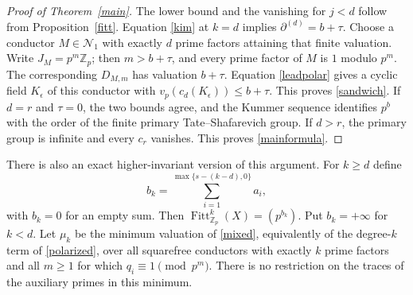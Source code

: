 \documentclass[11pt]{article}
\theoremstyle{remark}\newtheorem{remark}[theorem]{Remark}
\newcommand{\Z}{\mathbb Z}\newcommand{\Q}{\mathbb Q}\newcommand{\F}{\mathbb F}
\newcommand{\Fitt}{\operatorname{Fitt}}
\begin{document}
\begin{proof}[Proof of Theorem~\ref{main}]
The lower bound and the vanishing for $j<d$ follow from Proposition~\ref{fitt}. Equation \eqref{kim} at $k=d$ implies $\partial^{(d)}=b+\tau$. Choose a conductor $M\in\mathcal N_1$ with exactly $d$ prime factors attaining that finite valuation. Write $J_M=p^m\Z_p$; then $m>b+\tau$, and every prime factor of $M$ is $1$ modulo $p^m$. The corresponding $D_{M,m}$ has valuation $b+\tau$. Equation \eqref{leadpolar} gives a cyclic field $K_\epsilon$ of this conductor with $v_p(c_d(K_\epsilon))\leq b+\tau$. This proves \eqref{sandwich}. If $d=r$ and $\tau=0$, the two bounds agree, and the Kummer sequence identifies $p^b$ with the order of the finite primary Tate--Shafarevich group. If $d>r$, the primary group is infinite and every $c_r$ vanishes. This proves \eqref{mainformula}.
\end{proof}

There is also an exact higher-invariant version of this argument. For $k\geq d$ define
\[
 b_k=\sum_{i=1}^{\max\{s-(k-d),0\}}a_i,
\]
with $b_k=0$ for an empty sum. Then $\Fitt^k_{\Z_p}(X)=(p^{b_k})$. Put $b_k=+\infty$ for $k<d$. Let $\mu_k$ be the minimum valuation of \eqref{mixed}, equivalently of the degree-$k$ term of \eqref{polarized}, over all squarefree conductors with exactly $k$ prime factors and all $m\geq1$ for which $q_i\equiv1\pmod{p^m}$. There is no restriction on the traces of the auxiliary primes in this minimum.
\end{document}
